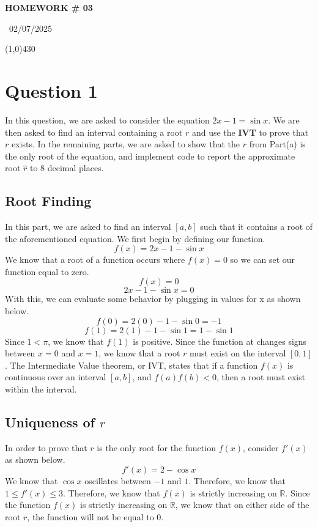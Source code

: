 \documentclass{article}
\theoremstyle{theorem}
\begin{document}
\begin{center}
 \LARGE\bfseries HOMEWORK \# 03
\end{center}
\begin{center}
    ~02/07/2025~
\end{center}
 \line(1,0){430}

\section{Question 1}
In this question, we are asked to consider the equation \(2x - 1 = \sin{x}\). We are then asked to find an interval containing a root \(r\) and use the \textbf{IVT} to prove that \(r\) exists. In the remaining parts, we are asked to show that the \(r\) from Part(a) is the only root of the equation, and implement code to report the approximate root \(\hat{r}\) to 8 decimal places.

\subsection{Root Finding}
In this part, we are asked to find an interval \([a,b]\) such that it contains a root of the aforementioned equation. We first begin by defining our function.
\[
f(x) = 2x - 1 - \sin{x}
\]
We know that a root of a function occurs where \(f(x) = 0\) so we can set our function equal to zero.
\[
f(x) = 0
\]
\[
2x-1-\sin{x} = 0
\]
With this, we can evaluate some behavior by plugging in values for x as shown below.
\[
f(0) = 2(0)-1-\sin{0} = -1
\]
\[
f(1) = 2(1)-1-\sin{1} = 1-\sin{1}
\]
Since \(1 < \pi\), we know that \(f(1)\) is positive. Since the function at changes signs between \(x=0\) and \(x = 1\), we know that a root \(r\) must exist on the interval \([0,1]\).
The Intermediate Value theorem, or IVT, states that if a function \(f(x)\) is continuous over an interval \([a,b]\), and \(f(a)f(b) < 0\), then a root must exist within the interval.

\subsection{Uniqueness of \(r\)}
In order to prove that \(r\) is the only root for the function \(f(x)\), consider \(f'(x)\) as shown below.
\[
f'(x) = 2-\cos{x}
\]
We know that \(\cos{x}\) oscillates between \(-1\) and \(1\). Therefore, we know that \(1 \leq f'(x) \leq 3\). Therefore, we know that \(f(x)\) is strictly increasing on \(\mathbb{R}\). Since the function \(f(x)\) is strictly increasing on \(\mathbb{R}\), we know that on either side of the root \(r\), the function will not be equal to \(0\).
\end{document}
